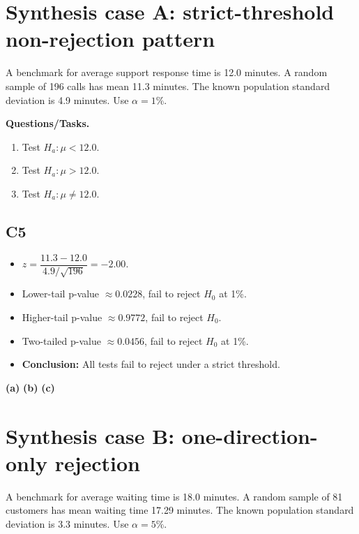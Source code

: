 \section{Synthesis case A: strict-threshold non-rejection pattern}
A benchmark for average support response time is 12.0 minutes. A random sample of 196 calls has mean 11.3 minutes. The known population standard deviation is 4.9 minutes. Use \(\alpha=1\%\).

\textbf{Questions/Tasks.}
\begin{enumerate}
    \item[(a)] Test \(H_a\colon \mu<12.0\).
    \item[(b)] Test \(H_a\colon \mu>12.0\).
    \item[(c)] Test \(H_a\colon \mu\ne12.0\).
\end{enumerate}

\subsection*{C5}
\begin{itemize}
    \item \(z=\dfrac{11.3-12.0}{4.9/\sqrt{196}}=-2.00\).
    \item Lower-tail p-value \(\approx0.0228\), fail to reject \(H_0\) at 1\%.
    \item Higher-tail p-value \(\approx0.9772\), fail to reject \(H_0\).
    \item Two-tailed p-value \(\approx0.0456\), fail to reject \(H_0\) at 1\%.
    \item \textbf{Conclusion:} All tests fail to reject under a strict threshold.
\end{itemize}

\begin{center}
\textbf{(a)}\;
\hspace{0.5cm}
\textbf{(b)}\;
\hspace{0.5cm}
\textbf{(c)}\;
\end{center}

\section{Synthesis case B: one-direction-only rejection}
A benchmark for average waiting time is 18.0 minutes. A random sample of 81 customers has mean waiting time 17.29 minutes. The known population standard deviation is 3.3 minutes. Use \(\alpha=5\%\).

